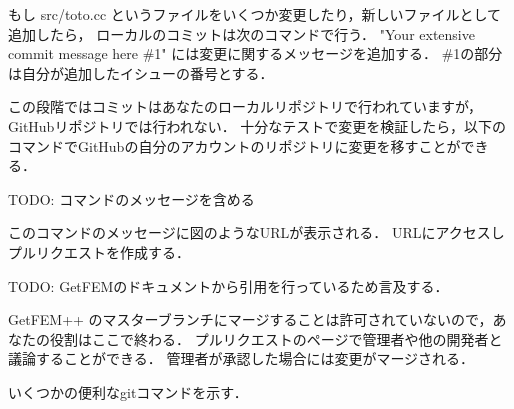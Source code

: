 \documentclass{ltjoc}
\begin{document}
\begin{shbox}
\end{shbox}

もし src/toto.cc というファイルをいくつか変更したり，新しいファイルとして追加したら，
ローカルのコミットは次のコマンドで行う．
"Your extensive commit message here \#1" には変更に関するメッセージを追加する．
\#1の部分は自分が追加したイシューの番号とする．

\begin{shbox}
\end{shbox}

この段階ではコミットはあなたのローカルリポジトリで行われていますが，GitHubリポジトリでは行われない．
十分なテストで変更を検証したら，以下のコマンドでGitHubの自分のアカウントのリポジトリに変更を移すことができる．

\begin{shbox}
\end{shbox}

TODO: コマンドのメッセージを含める

このコマンドのメッセージに図のようなURLが表示される．
URLにアクセスしプルリクエストを作成する．

TODO: GetFEMのドキュメントから引用を行っているため言及する．

GetFEM++ のマスターブランチにマージすることは許可されていないので，あなたの役割はここで終わる．
プルリクエストのページで管理者や他の開発者と議論することができる．
管理者が承認した場合には変更がマージされる．

いくつかの便利なgitコマンドを示す．

\begin{shbox}
\end{shbox}
\end{document}
